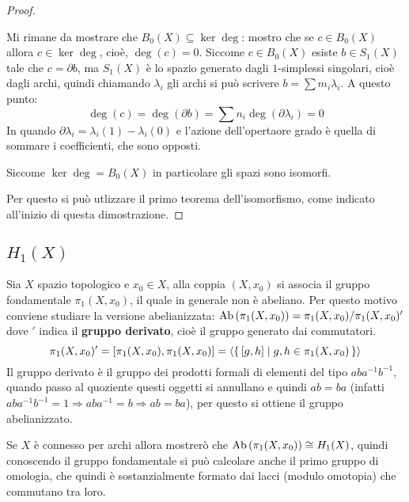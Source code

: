 \begin{proof}
\begin{enumerate}
    Mi rimane da mostrare che $ B_0(X) \subseteq \ker{\deg} $: mostro che se $ c \in B_0(X) $ allora
    $ c \in \ker{\deg} $, cioè, $ \deg(c) = 0 $.
    Siccome $ c \in B_0(X) $ esiste $ b \in S_1(X) $ tale che $ c = \partial b $, ma $ S_1(X) $
    è lo spazio generato dagli $ 1 $-simplessi singolari, cioè dagli archi, quindi
    chiamando $ \lambda_i $ gli archi si può scrivere $ b = \sum m_i \lambda_i $.
    A questo punto:
    \[
      \deg(c) = \deg(\partial b) = \sum n_i \deg(\partial \lambda_i) = 0
    \]
    In quando $ \partial \lambda_i = \lambda_i(1) - \lambda_i(0) $ e l'azione dell'opertaore grado è quella di sommare i coefficienti,
    che sono opposti.

    Siccome $ \ker{\deg} = B_0(X) $ in particolare gli spazi sono isomorfi.
  \end{enumerate}
  Per questo si può utlizzare il primo teorema dell'isomorfismo, come indicato
  all'inizio di questa dimostrazione.
\end{proof}

\subsection{$ H_1(X) $}


Sia $ X $ spazio topologico e $ x_0 \in X $, alla coppia $ (X, x_0) $ si associa
il gruppo fondamentale $ \pi_1(X,x_0) $, il quale in generale non è abeliano. Per
questo motivo conviene studiare la versione abelianizzata:
$ \mathrm{Ab}\left( \pi_1(X,x_0) \right) = {\pi_1(X,x_0)} \slash {\pi_1(X,x_0)'} $ dove $ ' $ indica il
  \textbf{gruppo derivato}, cioè il gruppo generato dai
  commutatori.
\[
  \pi_1(X,x_0)' = [\pi_1(X,x_0), \pi_1(X,x_0)] = \langle\set{[g,h] | g,h \in \pi_1(X,x_0)}\rangle
\]
Il gruppo derivato è il gruppo dei prodotti formali di elementi del tipo
$ aba^{-1}b^{-1} $, quando passo al quoziente questi oggetti si annullano e
quindi $ ab = ba $ (infatti
$ aba^{-1}b^{-1} = 1 \Rightarrow aba^{-1} = b \Rightarrow ab = ba $), per questo si ottiene il
gruppo abelianizzato.

Se $ X $ è connesso per archi allora mostrerò che $ \mathrm{Ab}\left( \pi_1(X,x_0) \right) \cong H_1(X) $,
quindi conoscendo il gruppo fondamentale si può calcolare anche
il primo gruppo di omologia, che quindi è sostanzialmente formato dai lacci
(modulo omotopia) che commutano tra loro.


